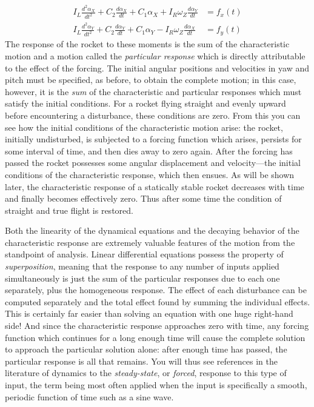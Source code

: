 \begin{equation}\label{ch2:eq:14}
\begin{aligned}
I_L \frac{d^{2}\alpha_X}{dt^{2}} + C_2 \frac{d\alpha_X}{dt} + C_1\alpha_X
    + I_R\omega_Z \frac{d\alpha_Y}{dt} &= f_x(t)\\
I_L \frac{d^{2}\alpha_Y}{dt^{2}} + C_2 \frac{d\alpha_Y}{dt} + C_1\alpha_Y
    - I_R\omega_Z \frac{d\alpha_X}{dt} &= f_y(t)
\end{aligned}
\end{equation}
The response of the rocket to these moments is the sum of the characteristic
motion and a motion called the \emph{particular response} which is directly
attributable to the effect of the forcing. The initial angular positions and
velocities in yaw and pitch must be specified, as before, to obtain the
complete motion; in this case, however, it is the \emph{sum} of the
characteristic and particular responses which must satisfy the initial
conditions. For a rocket flying straight and evenly upward before encountering
a disturbance, these conditions are zero. From this you can see how the
initial conditions of the characteristic motion arise: the rocket, initially
undisturbed, is subjected to a forcing function which arises, persists for
some interval of time, and then dies away to zero again. After the forcing has
passed the rocket possesses some angular displacement and velocity---the
initial conditions of the characteristic response, which then ensues. As will
be shown later, the characteristic response of a statically stable rocket
decreases with time and finally becomes effectively zero. Thus after some time
the condition of straight and true flight is restored.

Both the linearity of the dynamical equations and the decaying behavior of the
characteristic response are extremely valuable features of the motion from the
standpoint of analysis. Linear differential equations possess the property of
\emph{superposition}, meaning that the response to any number of inputs
applied simultaneously is just the sum of the particular responses due to each
one separately, plus the homogeneous response. The effect of each disturbance
can be computed separately and the total effect found by summing the
individual effects. This is certainly far easier than solving an equation with
one huge right-hand side! And since the characteristic response approaches
zero with time, any forcing function which continues for a long enough time
will cause the complete solution to approach the particular solution alone:
after enough time has passed, the particular response is all that remains. You
will thus see references in the literature of dynamics to the
\emph{steady-state}, or \emph{forced}, response to this type of input, the
term being most often applied when the input is specifically a smooth,
periodic function of time such as a sine wave.

